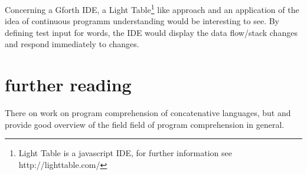 Concerning a Gforth IDE, a Light Table\footnote{Light Table is a javascript IDE, for further information see http://lighttable.com/} like approach and an application of the idea of continuous programm understanding\cite{Muller:2000:RER:336512.336526} would be interesting to see. By defining test input for words, the IDE would display the data flow/stack changes and respond immediately to changes.



\section{further reading}

There on work on program comprehension of concatenative languages, but \cite{Canfora:2011:ACS:1924421.1924451} and \cite{Cornelissen2009} provide good overview of the field field of program comprehension in general.